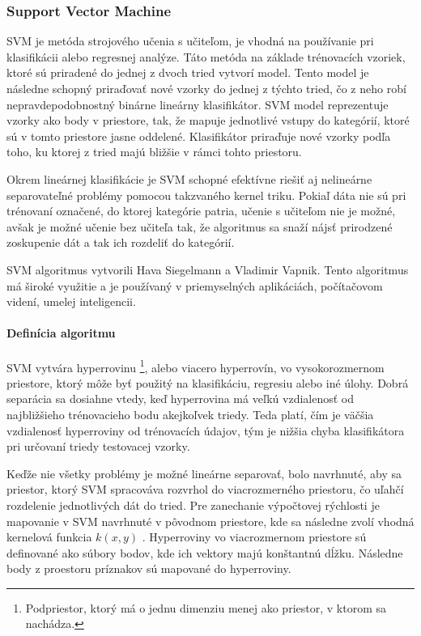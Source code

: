 \subsubsection{Support Vector Machine} \label{SVMlabel}
SVM je metóda strojového učenia s učiteľom, je vhodná na používanie pri klasifikácii alebo regresnej analýze. Táto metóda na základe trénovacích vzoriek, ktoré sú priradené do jednej z dvoch tried vytvorí model. Tento model je následne schopný priraďovať nové vzorky do jednej z týchto tried, čo z neho robí nepravdepodobnostný binárne lineárny klasifikátor. SVM model reprezentuje vzorky ako body v priestore, tak, že mapuje jednotlivé vstupy do kategórií, ktoré sú v tomto priestore jasne oddelené. Klasifikátor priraďuje nové vzorky podľa toho, ku ktorej z tried majú bližšie v rámci tohto priestoru.

Okrem lineárnej klasifikácie je SVM schopné efektívne riešiť aj nelineárne separovateľné problémy pomocou takzvaného kernel triku. Pokiaľ dáta nie sú pri trénovaní označené, do ktorej kategórie patria, učenie s učiteľom nie je možné, avšak je možné učenie bez učiteľa tak, že algoritmus sa snaží nájsť prirodzené zoskupenie dát a tak ich rozdeliť do kategórií.

SVM algoritmus vytvorili Hava Siegelmann a Vladimir Vapnik. Tento algoritmus má široké využitie a je používaný v priemyselných aplikáciách, počítačovom videní, umelej inteligencii.  \cite{c7}

\paragraph{Definícia algoritmu}
SVM vytvára hyperrovinu \footnote{Podpriestor, ktorý má o jednu dimenziu menej ako priestor, v ktorom sa nachádza.}, alebo viacero hyperrovín, vo vysokorozmernom priestore, ktorý môže byť použitý na klasifikáciu, regresiu alebo iné úlohy. Dobrá separácia sa dosiahne vtedy, keď hyperrovina má veľkú vzdialenosť od najbližšieho trénovacieho bodu akejkoľvek triedy. Teda platí, čím je väčšia vzdialenosť hyperroviny od trénovacích údajov, tým je nižšia chyba klasifikátora pri určovaní triedy testovacej vzorky.\cite{c12}

Keďže nie všetky problémy je možné lineárne separovať, bolo navrhnuté, aby sa priestor, ktorý SVM spracováva rozvrhol do viacrozmerného priestoru, čo uľahčí rozdelenie jednotlivých dát do tried. Pre zanechanie výpočtovej rýchlosti je mapovanie v SVM navrhnuté v pôvodnom priestore, kde sa následne zvolí vhodná kernelová funkcia $ k(x,y)$ . 
Hyperroviny vo viacrozmernom priestore sú definované ako súbory bodov, kde ich vektory majú konštantnú dĺžku. Následne body z proestoru príznakov sú mapované do hyperroviny. 

